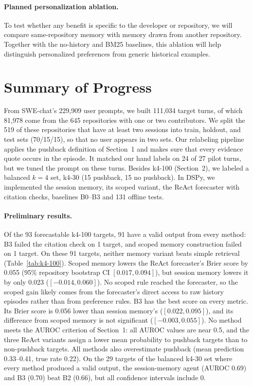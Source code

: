 \documentclass{article} %
\begin{document}
\paragraph{Planned personalization ablation.}
To test whether any benefit is specific to the developer or repository, we will compare same-repository memory with memory drawn from another repository. Together with the no-history and BM25 baselines, this ablation will help distinguish personalized preferences from generic historical examples.


\section{Summary of Progress}

From SWE-chat's 229{,}909 user prompts, we built 111{,}034 target turns, of which 81{,}978 come from the 645 repositories with one or two contributors.
We split the 519 of these repositories that have at least two sessions into train, holdout, and test sets (70/15/15), so that no user appears in two sets.
Our relabeling pipeline applies the pushback definition of Section~1 and makes sure that every evidence quote occurs in the episode.
It matched our hand labels on 24 of 27 pilot turns, but we tuned the prompt on these turns.
Besides k4-100 (Section~2), we labeled a balanced $k=4$ set, k4-30 (15 pushback, 15 no pushback).
In DSPy, we implemented the session memory, its scoped variant, the ReAct forecaster with citation checks, baselines B0--B3 and 131 offline tests.

\paragraph{Preliminary results.}
Of the 93 forecastable k4-100 targets, 91 have a valid output from every method: B3 failed the citation check on 1 target, and scoped memory construction failed on 1 target.
On these 91 targets, neither memory variant beats simple retrieval (Table~\ref{tab:k4-100}).
Scoped memory lowers the ReAct forecaster's Brier score by 0.055 (95\% repository bootstrap CI $[0.017, 0.094]$), but session memory lowers it by only 0.023 ($[-0.014, 0.060]$).
No scoped rule reached the forecaster, so the scoped gain likely comes from the forecaster's direct access to raw history episodes rather than from preference rules.
B3 has the best score on every metric.
Its Brier score is 0.056 lower than session memory's ($[0.022, 0.095]$), and its difference from scoped memory is not significant ($[-0.003, 0.055]$).
No method meets the AUROC criterion of Section~1: all AUROC values are near 0.5, and the three ReAct variants assign a lower mean probability to pushback targets than to non-pushback targets.
All methods also overestimate pushback (mean prediction 0.33--0.41, true rate 0.22).
On the 29 targets of the balanced k4-30 set where every method produced a valid output, the session-memory agent (AUROC 0.69) and B3 (0.70) beat B2 (0.66), but all confidence intervals include 0.
\end{document}
